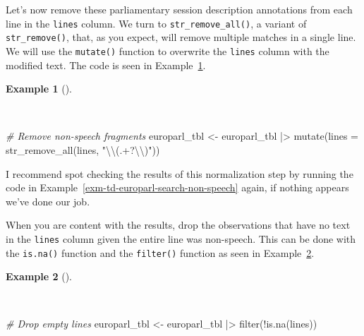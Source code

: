 \documentclass[
  letterpaper,
  DIV=11,
  numbers=noendperiod]{scrreprt}
\newenvironment{Shaded}{\begin{snugshade}}{\end{snugshade}}
\newcommand{\AttributeTok}[1]{\textcolor[rgb]{0.00,0.00,0.00}{#1}}
\newcommand{\CommentTok}[1]{\textcolor[rgb]{0.00,0.00,0.00}{\textit{#1}}}
\newcommand{\FunctionTok}[1]{\textcolor[rgb]{0.00,0.00,0.00}{#1}}
\newcommand{\NormalTok}[1]{\textcolor[rgb]{0.00,0.00,0.00}{#1}}
\newcommand{\OtherTok}[1]{\textcolor[rgb]{0.00,0.00,0.00}{#1}}
\newcommand{\SpecialCharTok}[1]{\textcolor[rgb]{0.00,0.00,0.00}{#1}}
\newcommand{\StringTok}[1]{\textcolor[rgb]{0.00,0.00,0.00}{#1}}
\theoremstyle{definition}
\newtheorem{example}{Example}[chapter]
\theoremstyle{remark}
\begin{document}
Let's now remove these parliamentary session description annotations
from each line in the \texttt{lines} column. We turn to
\texttt{str\_remove\_all()}, a variant of \texttt{str\_remove()}, that,
as you expect, will remove multiple matches in a single line. We will
use the \texttt{mutate()} function to overwrite the \texttt{lines}
column with the modified text. The code is seen in
Example~\ref{exm-td-europarl-remove-non-speech}.

\begin{example}[]\protect\hypertarget{exm-td-europarl-remove-non-speech}{}\label{exm-td-europarl-remove-non-speech}

~

\begin{Shaded}
\begin{Highlighting}[]
\CommentTok{\# Remove non{-}speech fragments}
\NormalTok{europarl\_tbl }\OtherTok{\textless{}{-}}
\NormalTok{  europarl\_tbl }\SpecialCharTok{|\textgreater{}}
  \FunctionTok{mutate}\NormalTok{(}\AttributeTok{lines =} \FunctionTok{str\_remove\_all}\NormalTok{(lines, }\StringTok{"}\SpecialCharTok{\textbackslash{}\textbackslash{}}\StringTok{(.+?}\SpecialCharTok{\textbackslash{}\textbackslash{}}\StringTok{)"}\NormalTok{))}
\end{Highlighting}
\end{Shaded}

\end{example}

I recommend spot checking the results of this normalization step by
running the code in Example~\ref{exm-td-europarl-search-non-speech}
again, if nothing appears we've done our job.

When you are content with the results, drop the observations that have
no text in the \texttt{lines} column given the entire line was
non-speech. This can be done with the \texttt{is.na()} function and the
\texttt{filter()} function as seen in
Example~\ref{exm-td-europarl-drop-empty-lines}.

\begin{example}[]\protect\hypertarget{exm-td-europarl-drop-empty-lines}{}\label{exm-td-europarl-drop-empty-lines}

~

\begin{Shaded}
\begin{Highlighting}[]
\CommentTok{\# Drop empty lines}
\NormalTok{europarl\_tbl }\OtherTok{\textless{}{-}}
\NormalTok{  europarl\_tbl }\SpecialCharTok{|\textgreater{}}
  \FunctionTok{filter}\NormalTok{(}\SpecialCharTok{!}\FunctionTok{is.na}\NormalTok{(lines))}
\end{Highlighting}
\end{Shaded}

\end{example}
\end{document}
